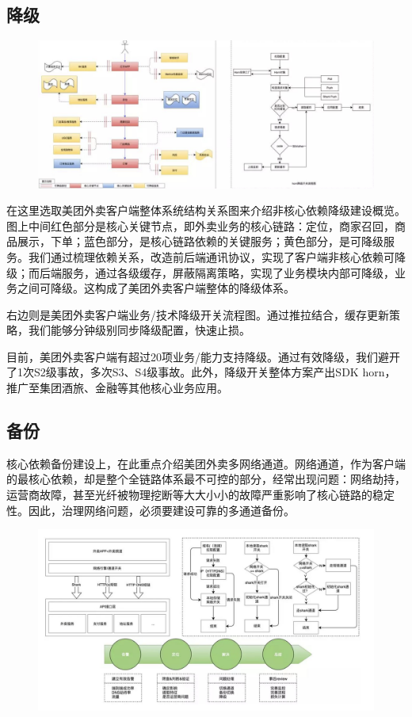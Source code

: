 \documentclass[12pt]{article}
\begin{document}
\subsection{降级}
\begin{figure}[H]
    \centering
    \includegraphics[width=1\textwidth]{fig/Meituan_APP_High_7.png}
\end{figure}

在这里选取美团外卖客户端整体系统结构关系图来介绍非核心依赖降级建设概览。图上中间红色部分是核心关键节点，即外卖业务的核心链路：定位，商家召回，商品展示，下单；蓝色部分，是核心链路依赖的关键服务；黄色部分，是可降级服务。我们通过梳理依赖关系，改造前后端通讯协议，实现了客户端非核心依赖可降级；而后端服务，通过各级缓存，屏蔽隔离策略，实现了业务模块内部可降级，业务之间可降级。这构成了美团外卖客户端整体的降级体系。

右边则是美团外卖客户端业务/技术降级开关流程图。通过推拉结合，缓存更新策略，我们能够分钟级别同步降级配置，快速止损。

目前，美团外卖客户端有超过20项业务/能力支持降级。通过有效降级，我们避开了1次S2级事故，多次S3、S4级事故。此外，降级开关整体方案产出SDK horn，推广至集团酒旅、金融等其他核心业务应用。

\subsection{备份}
核心依赖备份建设上，在此重点介绍美团外卖多网络通道。网络通道，作为客户端的最核心依赖，却是整个全链路体系最不可控的部分，经常出现问题：网络劫持，运营商故障，甚至光纤被物理挖断等大大小小的故障严重影响了核心链路的稳定性。因此，治理网络问题，必须要建设可靠的多通道备份。

\begin{figure}[H]
    \centering
    \includegraphics[width=1\textwidth]{fig/Meituan_APP_High_8.png}
\end{figure}
\end{document}

